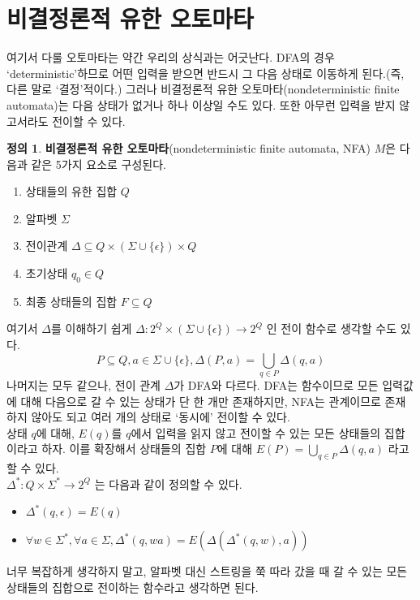 \documentclass[b5paper, 10pt]{book}
\theoremstyle{definition}
\newtheorem{defn}{정의}[chapter]
\begin{document}
\section{비결정론적 유한 오토마타}
여기서 다룰 오토마타는 약간 우리의 상식과는 어긋난다. 
DFA의 경우 `deterministic'하므로 어떤 입력을 받으면 반드시 그 다음 상태로 이동하게 된다.(즉,
다른 말로 `결정'적이다.) 그러나 비결정론적 유한 오토마타(nondeterministic 
finite automata)는 다음 상태가 없거나
하나 이상일 수도 있다. 또한 아무런 입력을 받지 않고서라도 전이할 수 있다.
\begin{defn}\textbf{비결정론적 유한 오토마타}(nondeterministic finite
automata, NFA) $M$은 다음과 같은 5가지 요소로 구성된다.
\begin{enumerate}
    \item 상태들의 유한 집합 $Q$
    \item 알파벳 $\Sigma$
    \item 전이관계 $\Delta \subseteq Q \times (\Sigma \cup \{\epsilon\}) \times Q$
    \item 초기상태 $q_0 \in Q$
    \item 최종 상태들의 집합 $F \subseteq Q$
\end{enumerate}
\end{defn}
여기서 $\Delta$를 이해하기 쉽게 $\Delta: 2^Q 
\times (\Sigma \cup \{\epsilon\}) \rightarrow 2^{Q}$ 인 전이 함수로 생각할 수도 있다.
$$P \subseteq Q, a\in \Sigma \cup \{\epsilon\}, \Delta(P, a) = \bigcup_{q\in P}
\Delta (q, a) $$
나머지는 모두 같으나, 전이 관계 $\Delta$가 DFA와 다르다. DFA는 함수이므로
모든 입력값에 대해 다음으로 갈 수 있는 상태가 단 한 개만 존재하지만, NFA는 관계이므로
존재하지 않아도 되고 여러 개의 상태로 `동시에' 전이할 수 있다.\\
상태 $q$에 대해, $E(q)$를 $q$에서 입력을 읽지 않고 전이할 수 있는 모든 상태들의
집합이라고 하자. 이를 확장해서 상태들의 집합 $P$에 대해 $E(P) = \bigcup_{q\in P} 
\Delta(q, a)$ 라고 할 수 있다. \\
$\Delta^*: Q \times \Sigma^* \rightarrow 2^{Q} $ 는 다음과 같이 정의할 수 있다. 
\begin{itemize}
    \item $\Delta^* (q, \epsilon) = E(q)$
    \item $\forall w \in \Sigma^* ,  \forall a \in \Sigma,
    \Delta^* (q, wa) = E(\Delta(\Delta^*(q, w), a))$
\end{itemize}
너무 복잡하게 생각하지 말고, 알파벳 대신 
스트링을 쭉 따라 갔을 때 갈 수 있는 모든 상태들의 집합으로 전이하는 함수라고 생각하면 된다.\\
\end{document}
